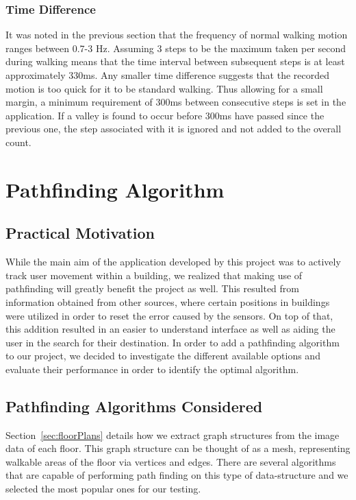 \documentclass[12pt,a4paper]{report}
\begin{document}
\subsubsection{Time Difference}

It was noted in the previous section that the frequency of normal walking motion ranges between 0.7-3 Hz. Assuming 3 steps to be the maximum taken per second during walking means that the time interval between subsequent steps is at least approximately 330ms. Any smaller time difference suggests that the recorded motion is too quick for it to be standard walking. Thus allowing for a small margin, a minimum requirement of 300ms between consecutive steps is set in the application. If a valley is found to occur before 300ms have passed since the previous one, the step associated with it is ignored and not added to the overall count.

\section{Pathfinding Algorithm}

\subsection{Practical Motivation}
While the main aim of the application developed by this project was to actively track user movement within a building, we realized that making use of pathfinding will greatly benefit the project as well. This resulted from information obtained from other sources, where certain positions in buildings were utilized in order to reset the error caused by the sensors. On top of that, this addition resulted in an easier to understand interface as well as aiding the user in the search for their destination. In order to add a pathfinding algorithm to our project, we decided to investigate the different available options and evaluate their performance in order to identify the optimal algorithm.

\subsection{Pathfinding Algorithms Considered}
Section~\ref{sec:floorPlans} details how we extract graph structures from the image data of each floor. This graph structure can be thought of as a mesh, representing walkable areas of the floor via vertices and edges. There are several algorithms that are capable of performing path finding on this type of data-structure and we selected the most popular ones for our testing. 
\end{document}

